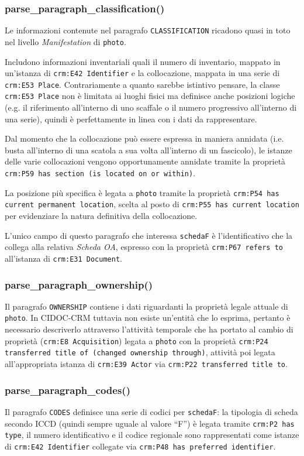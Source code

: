 \subsubsection{parse\_paragraph\_classification()}
Le informazioni contenute nel paragrafo \texttt{CLASSIFICATION} ricadono quasi in toto nel livello \emph{Manifestation} di \texttt{photo}.

Includono informazioni inventariali quali il numero di inventario, mappato in un'istanza di \texttt{crm:E42 Identifier} e la collocazione, mappata in una serie di \texttt{crm:E53 Place}. Contrariamente a quanto sarebbe istintivo pensare, la classe \texttt{crm:E53 Place} non è limitata ai luoghi fisici ma definisce anche posizioni logiche (e.g. il riferimento all'interno di uno scaffale o il numero progressivo all'interno di una serie), quindi è perfettamente in linea con i dati da rappresentare.

Dal momento che la collocazione può essere espressa in maniera annidata (i.e. busta all'interno di una scatola a sua volta all'interno di un fascicolo), le istanze delle varie collocazioni vengono opportunamente annidate tramite la proprietà \texttt{crm:P59 has section (is located on or within)}.

La posizione più specifica è legata a \texttt{photo} tramite la proprietà \texttt{crm:P54 has current permanent location}, scelta al posto di \texttt{crm:P55 has current location} per evidenziare la natura definitiva della collocazione.

L'unico campo di questo paragrafo che interessa \texttt{schedaF} è l'identificativo che la collega alla relativa \emph{Scheda OA}, espresso con la proprietà \texttt{crm:P67 refers to} all'istanza di \texttt{crm:E31 Document}.

\subsubsection{parse\_paragraph\_ownership()}
Il paragrafo \texttt{OWNERSHIP} contiene i dati riguardanti la proprietà legale attuale di \texttt{photo}. In CIDOC-CRM tuttavia non esiste un'entità che lo esprima, pertanto è necessario descriverlo attraverso l'attività temporale che ha portato al cambio di proprietà (\texttt{crm:E8 Acquisition}) legata a \texttt{photo} con la proprietà \texttt{crm:P24 transferred title of (changed ownership through)}, attività poi legata all'appropriata istanza di \texttt{crm:E39 Actor} via \texttt{crm:P22 transferred title to}.

\subsubsection{parse\_paragraph\_codes()}
Il paragrafo \texttt{CODES} definisce una serie di codici per \texttt{schedaF}: la tipologia di scheda secondo ICCD (quindi sempre uguale al valore ``F'') è legata tramite \texttt{crm:P2 has type}, il numero identificativo e il codice regionale sono rappresentati come istanze di \texttt{crm:E42 Identifier} collegate via \texttt{crm:P48 has preferred identifier}.

